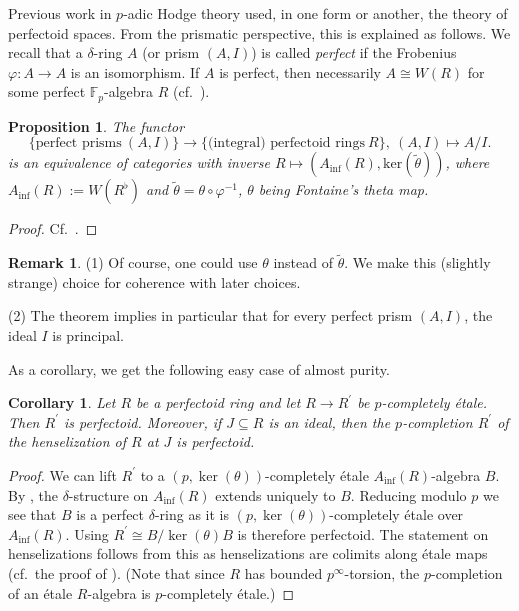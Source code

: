 \documentclass{amsart}
\theoremstyle{plain}
\newtheorem{proposition}[theorem]{Proposition}
\newtheorem{corollary}[theorem]{Corollary}
\theoremstyle{definition}
\newtheorem{remark}[theorem]{Remark}
\renewcommand{\inf}{\mathrm{inf}}
\newcommand{\red}[1]{{\color{black} #1}}
\begin{document}
Previous work in $p$-adic Hodge theory used, in one form or another, the theory of perfectoid spaces. From the prismatic perspective, this is explained as follows. We recall that a $\delta$-ring $A$ (or prism $(A,I)$) is called \textit{perfect} if the Frobenius $\varphi\colon A\to A$ is an isomorphism. If $A$ is perfect, then necessarily $A\cong W(R)$ for some perfect \red{$\mathbb{F}_p$-algebra} $R$ (cf.\ \cite[Corollary 2.30]{bhatt_scholze_prisms_and_prismatic_cohomology}).

\begin{proposition}
  \label{sec:generalities-prisms-theorem-perfect-prisms-equivalent-to-perfectoid-rings} The functor
  $$
  \{\textrm{perfect prisms} ~ (A,I) \}\to \{ \textrm{(integral) perfectoid rings} ~ R \},\ (A,I)\mapsto A/I.
  $$
  is an equivalence of categories with inverse $R\mapsto (A_{\mathrm{inf}}(R),\mathrm{ker}(\tilde{\theta}))$, where $A_\inf(R):=W(R^\flat)$ and $\tilde{\theta}=\theta \circ \varphi^{-1}$, $\theta$ being Fontaine's theta map.
\end{proposition}
\begin{proof}
  Cf.\ \cite[Theorem 3.9]{bhatt_scholze_prisms_and_prismatic_cohomology}.
\end{proof}

\begin{remark}
(1) Of course, one could use $\theta$ instead of $\tilde{\theta}$. We make this (slightly strange) choice for coherence with later choices.

(2) The theorem implies in particular that for every perfect prism $(A,I)$, the ideal $I$ is principal. 
\end{remark}

As a corollary, we get the following easy case of almost purity.

\begin{corollary}
  \label{sec:essent-surj-lemma-existence-of-perfectoid-covers-which-are-henselian-along-ideal} Let $R$ be a perfectoid ring and let $R\to R^\prime$ be $p$-completely \'etale. Then $R^\prime$ is perfectoid. Moreover, if $J\subseteq R$ is an ideal, then the $p$-completion $R^\prime$ of the henselization of $R$ at $J$ is perfectoid. 
\end{corollary}
\begin{proof}
  We can lift $R^\prime$ to a $(p,\ker(\theta))$-completely \'etale $A_\inf(R)$-algebra $B$. By \cite[Lemma 2.18]{bhatt_scholze_prisms_and_prismatic_cohomology}, the $\delta$-structure on $A_\inf(R)$ extends uniquely to $B$. Reducing modulo $p$ we see that $B$ is a perfect $\delta$-ring as it is $(p,\ker(\theta))$-completely \'etale over $A_\inf(R)$. Using  $R^\prime\cong B/\ker(\theta)B$ is therefore perfectoid.
  The statement on henselizations follows from this as henselizations are colimits along \'etale maps (cf.\ the proof of \cite[Tag 0A02]{stacks_project}). \red{(Note that since $R$ has bounded $p^{\infty}$-torsion, the $p$-completion of an \'etale $R$-algebra is $p$-completely \'etale.)}  
\end{proof}
\end{document}
